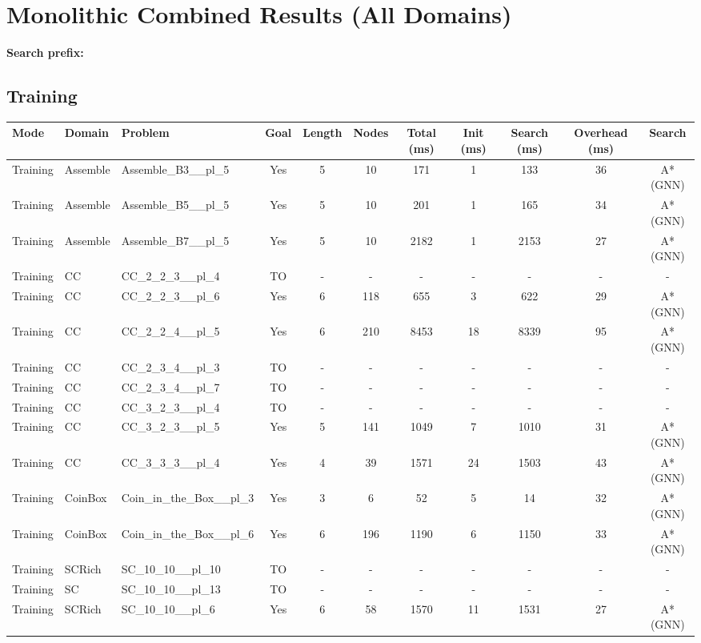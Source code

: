 \documentclass{article}
\begin{document}
\section*{Monolithic Combined Results (All Domains)}
\textbf{Search prefix:} 
\\[0.5cm]
\subsection*{Training}
\begin{tabular}{lllcccccccc}
\toprule
Mode & Domain & Problem & Goal & Length & Nodes & Total (ms) & Init (ms) & Search (ms) & Overhead (ms) & Search \\
\midrule
Training & Assemble & Assemble\_B3\_\_pl\_5 & Yes & 5 & 10 & 171 & 1 & 133 & 36 & A*(GNN) \\
Training & Assemble & Assemble\_B5\_\_pl\_5 & Yes & 5 & 10 & 201 & 1 & 165 & 34 & A*(GNN) \\
Training & Assemble & Assemble\_B7\_\_pl\_5 & Yes & 5 & 10 & 2182 & 1 & 2153 & 27 & A*(GNN) \\
Training & CC & CC\_2\_2\_3\_\_pl\_4 & TO & - & - & - & - & - & - & - \\
Training & CC & CC\_2\_2\_3\_\_pl\_6 & Yes & 6 & 118 & 655 & 3 & 622 & 29 & A*(GNN) \\
Training & CC & CC\_2\_2\_4\_\_pl\_5 & Yes & 6 & 210 & 8453 & 18 & 8339 & 95 & A*(GNN) \\
Training & CC & CC\_2\_3\_4\_\_pl\_3 & TO & - & - & - & - & - & - & - \\
Training & CC & CC\_2\_3\_4\_\_pl\_7 & TO & - & - & - & - & - & - & - \\
Training & CC & CC\_3\_2\_3\_\_pl\_4 & TO & - & - & - & - & - & - & - \\
Training & CC & CC\_3\_2\_3\_\_pl\_5 & Yes & 5 & 141 & 1049 & 7 & 1010 & 31 & A*(GNN) \\
Training & CC & CC\_3\_3\_3\_\_pl\_4 & Yes & 4 & 39 & 1571 & 24 & 1503 & 43 & A*(GNN) \\
Training & CoinBox & Coin\_in\_the\_Box\_\_pl\_3 & Yes & 3 & 6 & 52 & 5 & 14 & 32 & A*(GNN) \\
Training & CoinBox & Coin\_in\_the\_Box\_\_pl\_6 & Yes & 6 & 196 & 1190 & 6 & 1150 & 33 & A*(GNN) \\
Training & SCRich & SC\_10\_10\_\_pl\_10 & TO & - & - & - & - & - & - & - \\
Training & SC & SC\_10\_10\_\_pl\_13 & TO & - & - & - & - & - & - & - \\
Training & SCRich & SC\_10\_10\_\_pl\_6 & Yes & 6 & 58 & 1570 & 11 & 1531 & 27 & A*(GNN) \\

\end{tabular}
\end{document}
